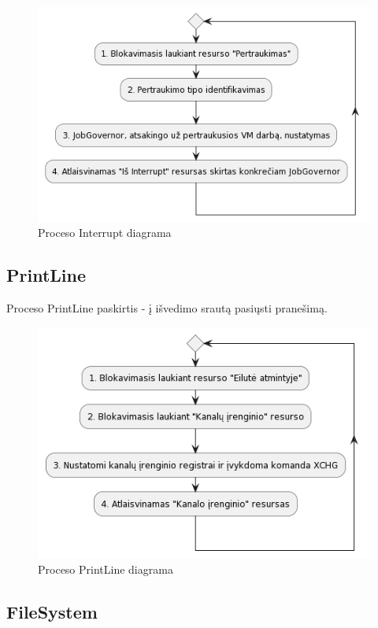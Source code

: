 \documentclass{VUMIFInfKursinis}
\begin{document}
\begin{figure}[H]
	\centering	
	\includegraphics[scale=0.65]{img/Interrupt}
	\caption{Proceso Interrupt diagrama}   %
	\label{img:Interrupt}
\end{figure}

\subsection{PrintLine}

Proceso PrintLine paskirtis - į išvedimo srautą pasiųsti pranešimą.

\begin{figure}[H]
	\centering	
	\includegraphics[scale=0.65]{img/PrintLine}
	\caption{Proceso PrintLine diagrama}   %
	\label{img:PrintLine}
\end{figure}

\subsection{FileSystem}
\end{document}
